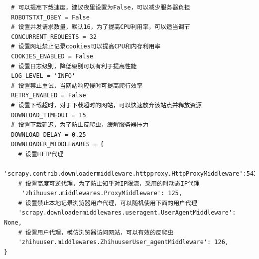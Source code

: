 \documentclass[bachelor,adobefonts]{jnuthesis}
\begin{document}
\begin{lstlisting}
  # 可以提高下载速度，建议夜里设置为False，可以减少服务器负担
  ROBOTSTXT_OBEY = False  
  # 设置并发请求数量，默认16，为了提高CPU利用率，可以适当调节
  CONCURRENT_REQUESTS = 32
  # 设置网址禁止记录cookies可以提高CPU和内存利用率
  COOKIES_ENABLED = False
  # 设置日志级别，降低级别可以有利于提高性能
  LOG_LEVEL = 'INFO'
  # 设置禁止重试，当网站响应慢时可提高爬行效率
  RETRY_ENABLED = False
  # 设置下载超时，对于下载超时的网站，可以快速放弃该站点并释放资源
  DOWNLOAD_TIMEOUT = 15
  # 设置下载延迟，为了防止反爬虫，缓解服务器压力
  DOWNLOAD_DELAY = 0.25
  DOWNLOADER_MIDDLEWARES = {
    # 设置HTTP代理
    'scrapy.contrib.downloadermiddleware.httpproxy.HttpProxyMiddleware':543,
    # 设置高度可逆代理，为了防止知乎对IP限流，采用的时动态IP代理
     'zhihuuser.middlewares.ProxyMiddleware': 125,
    # 设置禁止本地记录浏览器用户代理，可以随机使用下面的用户代理
    'scrapy.downloadermiddlewares.useragent.UserAgentMiddleware': None,
    # 设置用户代理，模仿浏览器访问网站，可以有效的反爬虫
    'zhihuuser.middlewares.ZhihuuserUser_agentMiddleware': 126,
}
\end{lstlisting}










\end{document}
